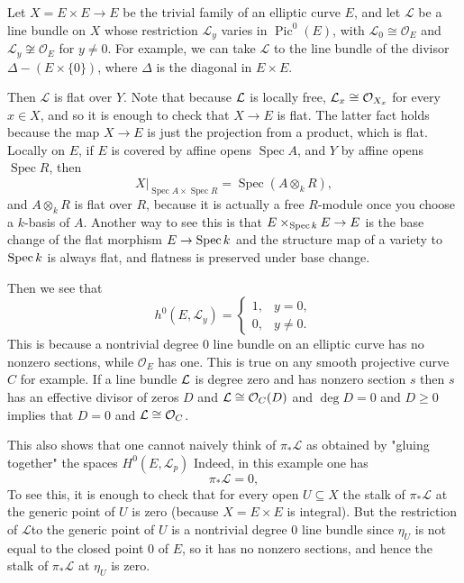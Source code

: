 \documentclass[12pt]{article}
\begin{document}
\begin{example}
    Let $X = E \times E \to E$ be the trivial family of an elliptic curve $E$, and let $\mathcal L$ be a line bundle on $X$ whose restriction $\mathcal L_y$ varies in $\operatorname{Pic}^0(E)$, with
    $\mathcal L_0 \cong \mathcal O_E$ and $\mathcal L_y \not\cong \mathcal O_E$ for $y \neq 0$. For example, we can take $\mathcal L$ to the line bundle of the divisor $\Delta - (E \times \{0\})$, where $\Delta$ is the diagonal in $E \times E$.

    Then $\mathcal{L}$ is flat over $Y$. Note that because ${\mathcal{L}}$ is locally free, ${\mathcal{L}}_x\cong {\mathcal{O}}_{X_x}$ for every $x\in X$, and so it is enough to check that $X \to E$ is flat. The latter fact holds because the map $X \to E$ is just the projection from a product, which is flat. Locally on $E$, if $E$ is covered by affine opens $\operatorname{Spec} A$, and $Y$ by affine opens $\operatorname{Spec} R$, then
    \[
        X|_{\operatorname{Spec}A\times \operatorname{Spec}R}
        =
        \operatorname{Spec}(A\otimes_k R),
    \]
    and $A\otimes_k R$ is flat over $R$, because it is actually a free $R$-module once you choose a $k$-basis of $A$. Another way to see this is that $E \times_{\operatorname{Spec} k} E \to E$ is the base change of the flat morphism $E \to \operatorname{Spec} k$ and the structure map of a variety to $\operatorname{Spec} k$ is always flat, and flatness is preserved under base change.

    Then we see that
    \[
        h^0(E,\mathcal L_y)=
        \begin{cases}
            1, & y=0,     \\
            0, & y\neq 0.
        \end{cases}
    \]
    This is because a nontrivial degree $0$ line bundle on an elliptic curve has no nonzero sections, while $\mathcal O_E$ has one. This is true on any smooth projective curve $C$ for example. If a line bundle ${\mathcal{L}}$ is degree zero and has nonzero section $s$ then $s$ has an effective divisor of zeros $D$ and ${\mathcal{L}}\cong {\mathcal{O}}_C(D)$ and $\deg D = 0$ and $D \geq 0$ implies that $D=0$ and ${\mathcal{L}}\cong {\mathcal{O}}_C$.

    This also shows that one cannot naively think of \(\pi_*\mathcal L\) as obtained by "gluing together" the spaces $H^0(E,\mathcal L_p)$
    Indeed, in this example one has
    \[
        \pi_*\mathcal L = 0,
    \]
    To see this, it is enough to check that for every open $U \subseteq X$ the stalk of $\pi_*\mathcal L$ at the generic point of $U$ is zero (because $X = E\times E$ is integral). But the restriction of $\mathcal L $to the generic point of $U$ is a nontrivial degree 0 line bundle since $\eta_U$ is not equal to the closed point $0$ of $E$, so it has no nonzero sections, and hence the stalk of $\pi_*\mathcal L$ at $\eta_U$ is zero.


\end{example}
\end{document}
